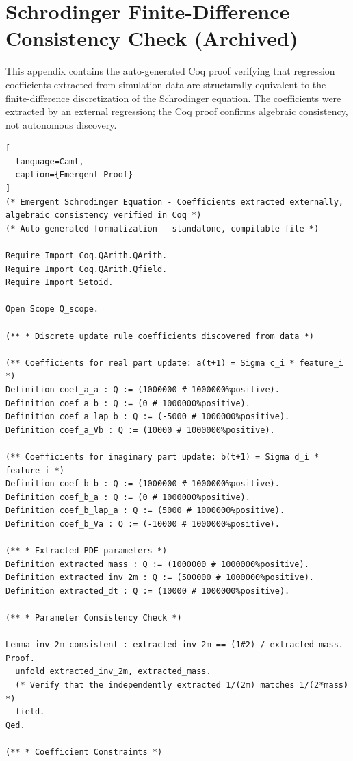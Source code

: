 \chapter{Schrodinger Finite-Difference Consistency Check (Archived)}
\label{app:schrodinger}

This appendix contains the auto-generated Coq proof verifying that regression coefficients extracted from simulation data are structurally equivalent to the finite-difference discretization of the Schrodinger equation. The coefficients were extracted by an external regression; the Coq proof confirms algebraic consistency, not autonomous discovery.

\begin{lstlisting}[
  language=Caml,
  caption={Emergent Proof}
]
(* Emergent Schrodinger Equation - Coefficients extracted externally, algebraic consistency verified in Coq *)
(* Auto-generated formalization - standalone, compilable file *)

Require Import Coq.QArith.QArith.
Require Import Coq.QArith.Qfield.
Require Import Setoid.

Open Scope Q_scope.

(** * Discrete update rule coefficients discovered from data *)

(** Coefficients for real part update: a(t+1) = Sigma c_i * feature_i *)
Definition coef_a_a : Q := (1000000 # 1000000%positive).
Definition coef_a_b : Q := (0 # 1000000%positive).
Definition coef_a_lap_b : Q := (-5000 # 1000000%positive).
Definition coef_a_Vb : Q := (10000 # 1000000%positive).

(** Coefficients for imaginary part update: b(t+1) = Sigma d_i * feature_i *)
Definition coef_b_b : Q := (1000000 # 1000000%positive).
Definition coef_b_a : Q := (0 # 1000000%positive).
Definition coef_b_lap_a : Q := (5000 # 1000000%positive).
Definition coef_b_Va : Q := (-10000 # 1000000%positive).

(** * Extracted PDE parameters *)
Definition extracted_mass : Q := (1000000 # 1000000%positive).
Definition extracted_inv_2m : Q := (500000 # 1000000%positive).
Definition extracted_dt : Q := (10000 # 1000000%positive).

(** * Parameter Consistency Check *)

Lemma inv_2m_consistent : extracted_inv_2m == (1#2) / extracted_mass.
Proof.
  unfold extracted_inv_2m, extracted_mass.
  (* Verify that the independently extracted 1/(2m) matches 1/(2*mass) *)
  field.
Qed.

(** * Coefficient Constraints *)


\end{lstlisting}
